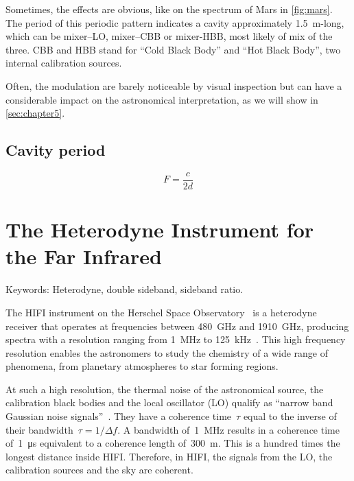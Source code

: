 Sometimes, the effects are obvious, like on the spectrum of Mars in \cref{fig:mars}.
The period of this periodic pattern indicates a cavity approximately \SI{1.5}{\meter}-long, which can be mixer--LO, mixer--CBB or mixer-HBB, most likely of mix of the three.
CBB and HBB stand for ``Cold Black Body'' and ``Hot Black Body'', two internal calibration sources.

Often, the modulation are barely noticeable by visual inspection but can have a considerable impact on the astronomical interpretation, as we will show in \cref{sec:chapter5}.


\subsection{Cavity period}
\begin{equation}
    F = \frac{c}{2d} \label{eq:cavity_period}
\end{equation}


\section{The Heterodyne Instrument for the Far Infrared}

Keywords: Heterodyne, double sideband, sideband ratio.

The HIFI instrument on the Herschel Space Observatory~\cite{AA_518_L1} is a heterodyne receiver that operates at frequencies between \SI{480}{\giga\hertz} and \SI{1910}{\giga\hertz},
producing spectra with a resolution ranging from \SI{1}{\mega\hertz} to \SI{125}{\kilo\hertz}~\cite{AA_518_L6}.
This high frequency resolution enables the astronomers to study the chemistry of a wide range of phenomena, from planetary atmospheres to star forming regions.

At such a high resolution, the thermal noise of the astronomical source, the calibration black bodies and the local oscillator (LO) qualify as ``narrow band Gaussian noise signals''~\cite{siegman1986lasers}.
They have a coherence time~$\tau$ equal to the inverse of their bandwidth~$\tau=1/\Delta f$.
A bandwidth of~\SI{1}{\mega\hertz} results in a coherence time of~\SI{1}{\micro\second} equivalent to a coherence length of~\SI{300}{\meter}.
This is a hundred times the longest distance inside HIFI.
Therefore, in HIFI, the signals from the LO, the calibration sources and the sky are coherent.

